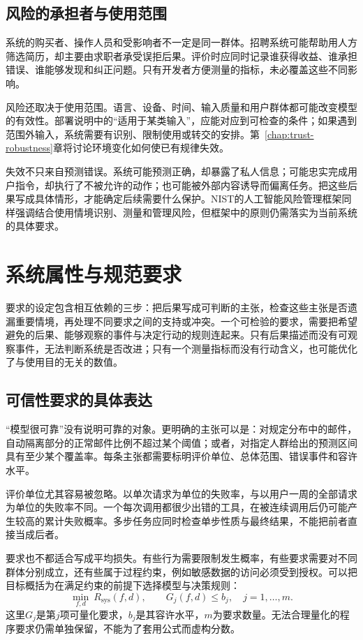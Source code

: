 \subsection{风险的承担者与使用范围}

系统的购买者、操作人员和受影响者不一定是同一群体。招聘系统可能帮助用人方筛选简历，却主要由求职者承受误拒后果。评价时应同时记录谁获得收益、谁承担错误、谁能够发现和纠正问题。只有开发者方便测量的指标，未必覆盖这些不同影响。

风险还取决于使用范围。语言、设备、时间、输入质量和用户群体都可能改变模型的有效性。部署说明中的“适用于某类输入”，应能对应到可检查的条件；如果遇到范围外输入，系统需要有识别、限制使用或转交的安排。第~\ref{chap:trust-robustness}章将讨论环境变化如何使已有规律失效。

失效不只来自预测错误。系统可能预测正确，却暴露了私人信息；可能忠实完成用户指令，却执行了不被允许的动作；也可能被外部内容诱导而偏离任务。把这些后果写成具体情形，才能确定后续需要什么保护。NIST的人工智能风险管理框架同样强调结合使用情境识别、测量和管理风险，但框架中的原则仍需落实为当前系统的具体要求。

\section{系统属性与规范要求}
\label{sec:trust-requirements}

要求的设定包含相互依赖的三步：把后果写成可判断的主张，检查这些主张是否遗漏重要情境，再处理不同要求之间的支持或冲突。一个可检验的要求，需要把希望避免的后果、能够观察的事件与决定行动的规则连起来。只有后果描述而没有可观察事件，无法判断系统是否改进；只有一个测量指标而没有行动含义，也可能优化了与使用目的无关的数值。

\subsection{可信性要求的具体表达}

“模型很可靠”没有说明可靠的对象。更明确的主张可以是：对规定分布中的邮件，自动隔离部分的正常邮件比例不超过某个阈值；或者，对指定人群给出的预测区间具有至少某个覆盖率。每条主张都需要标明评价单位、总体范围、错误事件和容许水平。

评价单位尤其容易被忽略。以单次请求为单位的失败率，与以用户一周的全部请求为单位的失败率不同。一个每次调用都很少出错的工具，在被连续调用后仍可能产生较高的累计失败概率。多步任务应同时检查单步性质与最终结果，不能把前者直接当成后者。

要求也不都适合写成平均损失。有些行为需要限制发生概率，有些要求需要对不同群体分别成立，还有些属于过程约束，例如敏感数据的访问必须受到授权。可以把目标概括为在满足约束的前提下选择模型与决策规则：
\begin{equation}
 \min_{f,d}\ R_{\mathrm{sys}}(f,d),
 \qquad
 G_j(f,d)\leq b_j,\quad j=1,\ldots,m.
 \label{eq:trust-constrained-objective}
\end{equation}
这里$G_j$是第$j$项可量化要求，$b_j$是其容许水平，$m$为要求数量。无法合理量化的程序要求仍需单独保留，不能为了套用公式而虚构分数。

